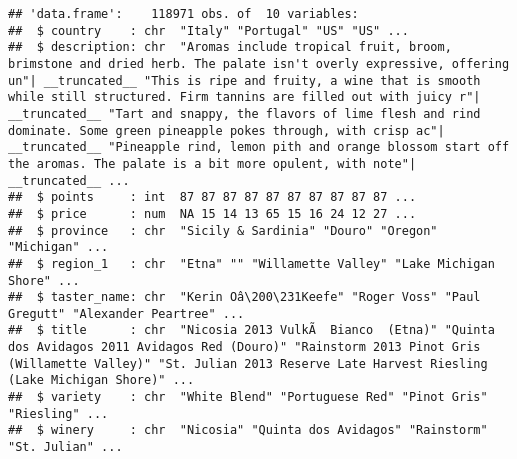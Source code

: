\documentclass[
]{article}
\newenvironment{Shaded}{\begin{snugshade}}{\end{snugshade}}
\newcommand{\CharTok}[1]{\textcolor[rgb]{0.31,0.60,0.02}{#1}}
\newcommand{\ControlFlowTok}[1]{\textcolor[rgb]{0.13,0.29,0.53}{\textbf{#1}}}
\newcommand{\DecValTok}[1]{\textcolor[rgb]{0.00,0.00,0.81}{#1}}
\newcommand{\KeywordTok}[1]{\textcolor[rgb]{0.13,0.29,0.53}{\textbf{#1}}}
\newcommand{\NormalTok}[1]{#1}
\newcommand{\OperatorTok}[1]{\textcolor[rgb]{0.81,0.36,0.00}{\textbf{#1}}}
\newcommand{\StringTok}[1]{\textcolor[rgb]{0.31,0.60,0.02}{#1}}
\begin{document}
\begin{verbatim}
## 'data.frame':    118971 obs. of  10 variables:
##  $ country    : chr  "Italy" "Portugal" "US" "US" ...
##  $ description: chr  "Aromas include tropical fruit, broom, brimstone and dried herb. The palate isn't overly expressive, offering un"| __truncated__ "This is ripe and fruity, a wine that is smooth while still structured. Firm tannins are filled out with juicy r"| __truncated__ "Tart and snappy, the flavors of lime flesh and rind dominate. Some green pineapple pokes through, with crisp ac"| __truncated__ "Pineapple rind, lemon pith and orange blossom start off the aromas. The palate is a bit more opulent, with note"| __truncated__ ...
##  $ points     : int  87 87 87 87 87 87 87 87 87 87 ...
##  $ price      : num  NA 15 14 13 65 15 16 24 12 27 ...
##  $ province   : chr  "Sicily & Sardinia" "Douro" "Oregon" "Michigan" ...
##  $ region_1   : chr  "Etna" "" "Willamette Valley" "Lake Michigan Shore" ...
##  $ taster_name: chr  "Kerin Oâ\200\231Keefe" "Roger Voss" "Paul Gregutt" "Alexander Peartree" ...
##  $ title      : chr  "Nicosia 2013 VulkÃ  Bianco  (Etna)" "Quinta dos Avidagos 2011 Avidagos Red (Douro)" "Rainstorm 2013 Pinot Gris (Willamette Valley)" "St. Julian 2013 Reserve Late Harvest Riesling (Lake Michigan Shore)" ...
##  $ variety    : chr  "White Blend" "Portuguese Red" "Pinot Gris" "Riesling" ...
##  $ winery     : chr  "Nicosia" "Quinta dos Avidagos" "Rainstorm" "St. Julian" ...
\end{verbatim}

\begin{Shaded}
\end{Shaded}
\end{document}
